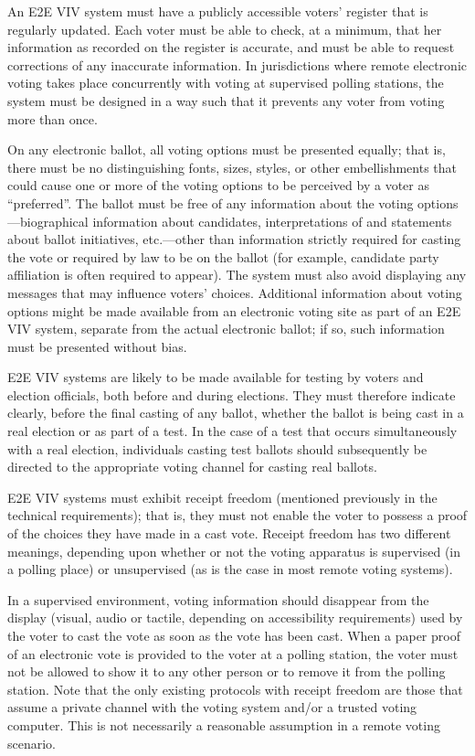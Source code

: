 An E2E VIV system must have a publicly accessible voters' register
that is regularly updated. Each voter must be able to check, at a
minimum, that her information as recorded on the register is accurate,
and must be able to request corrections of any inaccurate
information. In jurisdictions where remote electronic voting takes
place concurrently with voting at supervised polling stations, the
system must be designed in a way such that it prevents any voter from
voting more than once.

On any electronic ballot, all voting options must be presented
equally; that is, there must be no distinguishing fonts, sizes,
styles, or other embellishments that could cause one or more of the
voting options to be perceived by a voter as ``preferred''. The ballot
must be free of any information about the voting
options---biographical information about candidates, interpretations
of and statements about ballot initiatives, etc.---other than
information strictly required for casting the vote or required by law
to be on the ballot (for example, candidate party affiliation is often
required to appear). The system must also avoid displaying any
messages that may influence voters' choices. Additional information
about voting options might be made available from an electronic voting
site as part of an E2E VIV system, separate from the actual electronic
ballot; if so, such information must be presented without bias.

E2E VIV systems are likely to be made available for testing by voters
and election officials, both before and during elections. They must
therefore indicate clearly, before the final casting of any ballot,
whether the ballot is being cast in a real election or as part of a
test. In the case of a test that occurs simultaneously with a real
election, individuals casting test ballots should subsequently be
directed to the appropriate voting channel for casting real ballots.

E2E VIV systems must exhibit receipt freedom (mentioned previously in
the technical requirements); that is, they must not enable the voter
to possess a proof of the choices they have made in a cast
vote. Receipt freedom has two different meanings, depending upon
whether or not the voting apparatus is supervised (in a polling place)
or unsupervised (as is the case in most remote voting systems).

In a supervised environment, voting information should disappear from
the display (visual, audio or tactile, depending on accessibility
requirements) used by the voter to cast the vote as soon as the vote
has been cast. When a paper proof of an electronic vote is provided to
the voter at a polling station, the voter must not be allowed to show
it to any other person or to remove it from the polling station. Note
that the only existing protocols with receipt freedom are those that
assume a private channel with the voting system and/or a trusted
voting computer. This is not necessarily a reasonable assumption in a
remote voting scenario.

